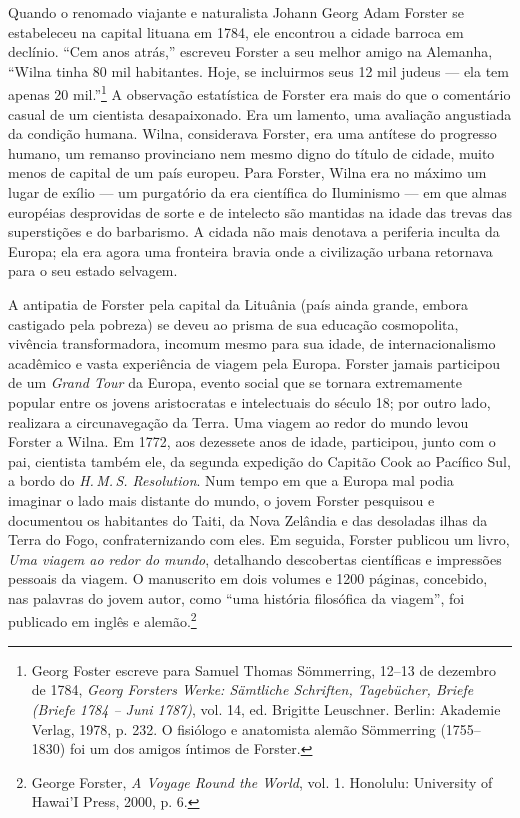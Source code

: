Quando o renomado viajante e naturalista Johann Georg Adam Forster se
estabeleceu na capital lituana em 1784, ele encontrou a cidade barroca
em declínio. ``Cem anos atrás,'' escreveu Forster a seu melhor amigo na
Alemanha, ``Wilna tinha 80 mil habitantes. Hoje, se incluirmos seus 12
mil judeus --- ela tem apenas 20 mil.''\footnote{Georg Foster escreve para
  Samuel Thomas Sömmerring, 12--13 de dezembro de 1784, \emph{Georg
  Forsters Werke: Sämtliche Schriften, Tagebücher, Briefe (Briefe 1784 --
  Juni 1787)}, vol. 14, ed. Brigitte Leuschner. Berlin: Akademie Verlag,
  1978, p. 232. O fisiólogo e anatomista alemão Sömmerring (1755--1830)
  foi um dos amigos íntimos de Forster.} A observação estatística de
Forster era mais do que o comentário casual de um cientista
desapaixonado. Era um lamento, uma avaliação angustiada da condição
humana. Wilna, considerava Forster, era uma antítese do progresso
humano, um remanso provinciano nem mesmo digno do título de cidade,
muito menos de capital de um país europeu. Para Forster, Wilna era no
máximo um lugar de exílio --- um purgatório da era científica do
Iluminismo --- em que almas européias desprovidas de sorte e de intelecto
são mantidas na idade das trevas das superstições e do barbarismo. A
cidada não mais denotava a periferia inculta da Europa; ela era agora
uma fronteira bravia onde a civilização urbana retornava para o seu
estado selvagem.

A antipatia de Forster pela capital da Lituânia (país ainda grande,
embora castigado pela pobreza) se deveu ao prisma de sua educação
cosmopolita, vivência transformadora, incomum mesmo para sua idade, de
internacionalismo acadêmico e vasta experiência de viagem pela Europa.
Forster jamais participou de um \emph{Grand Tour} da Europa, evento
social que se tornara extremamente popular entre os jovens aristocratas
e intelectuais do século 18; por outro lado, realizara a circunavegação
da Terra. Uma viagem ao redor do mundo levou Forster a Wilna. Em 1772,
aos dezessete anos de idade, participou, junto com o pai, cientista
também ele, da segunda expedição do Capitão Cook ao Pacífico Sul, a
bordo do \emph{H.\,M.\,S. Resolution}. Num tempo em que a Europa mal podia
imaginar o lado mais distante do mundo, o jovem Forster pesquisou e
documentou os habitantes do Taiti, da Nova Zelândia e das desoladas
ilhas da Terra do Fogo, confraternizando com eles. Em seguida, Forster
publicou um livro, \emph{Uma viagem ao redor do mundo}, detalhando
descobertas científicas e impressões pessoais da viagem. O manuscrito em
dois volumes e 1200 páginas, concebido, nas palavras do jovem autor,
como ``uma história filosófica da viagem'', foi publicado em inglês e
alemão.\footnote{George Forster, \emph{A Voyage Round the World}, vol.
  1. Honolulu: University of Hawai'I Press, 2000, p. 6.}

